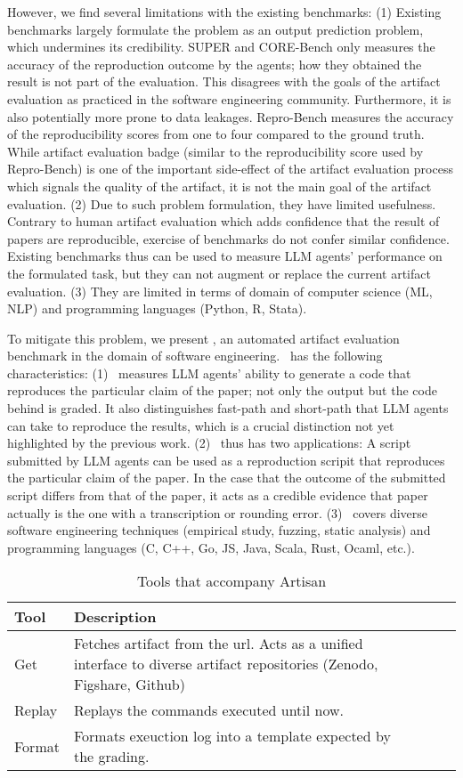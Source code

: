 However, we find several limitations with the existing benchmarks:
(1) Existing benchmarks largely formulate the problem as an output prediction problem, which undermines its credibility.
SUPER and CORE-Bench only measures the accuracy of the reproduction outcome by the agents; how they obtained the result is not part of the evaluation.
This disagrees with the goals of the artifact evaluation as practiced in the software engineering community.
Furthermore, it is also potentially more prone to data leakages.
Repro-Bench measures the accuracy of the reproducibility scores from one to four compared to the ground truth.
While artifact evaluation badge (similar to the reproducibility score used by Repro-Bench) is one of the important side-effect of the artifact evaluation process which signals the quality of the artifact, it is not the main goal of the artifact evaluation.
(2) Due to such problem formulation, they have limited usefulness.
Contrary to human artifact evaluation which adds confidence that the result of papers are reproducible, exercise of benchmarks do not confer similar confidence.
Existing benchmarks thus can be used to measure LLM agents' performance on the formulated task, but they can not augment or replace the current artifact evaluation.
(3) They are limited in terms of domain of computer science (ML, NLP) and programming languages (Python, R, Stata).

To mitigate this problem, we present \benchmark, an automated artifact evaluation benchmark in the domain of software engineering.
\benchmark~has the following characteristics:
(1) \benchmark~measures LLM agents' ability to generate a code that reproduces the particular claim of the paper; not only the output but the code behind is graded.
It also distinguishes fast-path and short-path that LLM agents can take to reproduce the results, which is a crucial distinction not yet highlighted by the previous work.
(2) \benchmark~thus has two applications:
A script submitted by LLM agents can be used as a reproduction scripit that reproduces the particular claim of the paper.
In the case that the outcome of the submitted script differs from that of the paper, it acts as a credible evidence that paper actually is the one with a transcription or rounding error.
(3) \benchmark~covers diverse software engineering techniques (empirical study, fuzzing, static analysis) and programming languages (C, C++, Go, JS, Java, Scala, Rust, Ocaml, etc.).

\begin{table}[t]
\caption{Tools that accompany Artisan}
\label{t:artisan_tools}
\centering
\renewcommand{\arraystretch}{1.25}
\begin{tabularx}{\linewidth}{lXXXX}
\toprule
Tool  & Description \\
\midrule
Get  & Fetches artifact from the url. Acts as a unified interface to diverse artifact repositories (Zenodo, Figshare, Github) \\
Replay & Replays the commands executed until now. \\
Format & Formats exeuction log into a template expected by the grading. \\
\bottomrule
\end{tabularx}
\end{table}


